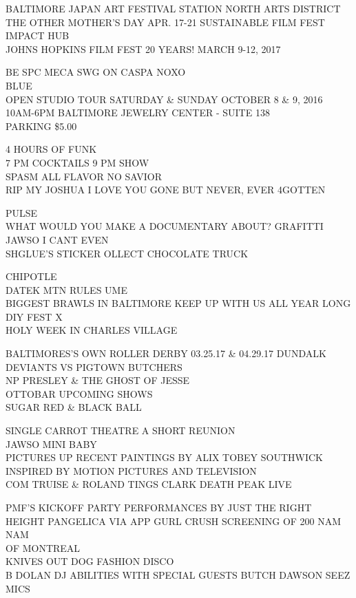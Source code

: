\documentclass[10pt,letterpaper]{article}
\begin{document}
BALTIMORE JAPAN ART FESTIVAL STATION NORTH ARTS DISTRICT\\
THE OTHER MOTHER'S DAY APR. 17{-}21 SUSTAINABLE FILM FEST\\
IMPACT HUB\\
JOHNS HOPKINS FILM FEST 20 YEARS!  MARCH 9{-}12, 2017

BE SPC MECA SWG ON CASPA NOXO\\
BLUE\\
OPEN STUDIO TOUR SATURDAY \& SUNDAY OCTOBER 8 \& 9, 2016 10AM{-}6PM BALTIMORE JEWELRY CENTER {-} SUITE 138\\
PARKING \$5.00

4 HOURS OF FUNK\\
7 PM COCKTAILS 9 PM SHOW\\
SPASM ALL FLAVOR NO SAVIOR\\
RIP MY JOSHUA I LOVE YOU GONE BUT NEVER, EVER 4GOTTEN

PULSE\\
WHAT WOULD YOU MAKE A DOCUMENTARY ABOUT?  GRAFITTI\\
JAWSO I CANT EVEN\\
SHGLUE'S STICKER OLLECT CHOCOLATE TRUCK

CHIPOTLE\\
DATEK MTN RULES UME\\
BIGGEST BRAWLS IN BALTIMORE KEEP UP WITH US ALL YEAR LONG DIY FEST X\\
HOLY WEEK IN CHARLES VILLAGE

BALTIMORES'S OWN ROLLER DERBY 03.25.17 \& 04.29.17 DUNDALK DEVIANTS VS PIGTOWN BUTCHERS\\
NP PRESLEY \& THE GHOST OF JESSE\\
OTTOBAR UPCOMING SHOWS\\
SUGAR RED \& BLACK BALL

SINGLE CARROT THEATRE A SHORT REUNION\\
JAWSO MINI BABY\\
PICTURES UP RECENT PAINTINGS BY ALIX TOBEY SOUTHWICK INSPIRED BY MOTION PICTURES AND TELEVISION\\
COM TRUISE \& ROLAND TINGS CLARK DEATH PEAK LIVE

PMF'S KICKOFF PARTY PERFORMANCES BY JUST THE RIGHT HEIGHT PANGELICA VIA APP GURL CRUSH SCREENING OF 200 NAM NAM\\
OF MONTREAL\\
KNIVES OUT DOG FASHION DISCO\\
B DOLAN DJ ABILITIES WITH SPECIAL GUESTS BUTCH DAWSON SEEZ MICS
\end{document}
